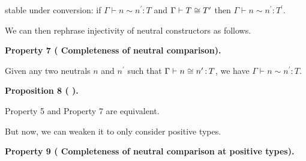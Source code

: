 stable under conversion: if $\Gamma\vdash n\sim n^{\prime}\operatorname{\mathrel{:}}T$ and $\Gamma\vdash T\mathrel{\raisebox{-0.5pt}{$\cong$}}T^{\prime}$ then $\Gamma\vdash n\sim n^{\prime}\operatorname{\mathrel{:}}T^{\prime}$.\par
 
 
  
 
 
 
We can then rephrase injectivity of neutral constructors as follows.\par
 
 
 
\par\medskip\noindent\textbf{Property 7 (  Completeness of neutral comparison).}\par
 
 
Given any two neutrals $n$ and $n^{\prime}$ such that $\Gamma\vdash n\mathrel{\raisebox{-0.5pt}{$\cong$}}n^{\prime}\operatorname{%
\mathrel{:}}T$, we have $\Gamma\vdash n\sim n^{\prime}\operatorname{\mathrel{:}}T$.\par
 
 
 
 
\par\medskip\noindent\textbf{Proposition 8 ( ).}\par
 
 
Property 5 and Property 7 are equivalent.\par
 
 
 
 
But now, we can weaken it to only consider positive types.\par
 
 
 
\par\medskip\noindent\textbf{Property 9 (  Completeness of neutral comparison at positive types).}\par
 
